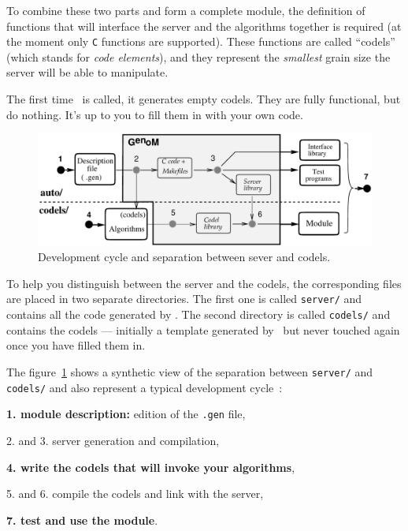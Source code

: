 To combine these two parts and form  a complete module, the definition of
functions that  will interface the server and  the algorithms together is
required (at the moment  only {\tt  C}  functions are  supported).  These
functions are  called ``codels'' (which  stands for {\em code elements}),
and they represent the {\em smallest} grain size  the server will be able
to manipulate.

The first  time \GenoM\  is called,  it generates empty  codels. They are
fully  functional, but do  nothing. It's up to  you to fill  them in with
your own code.

\bigbreak

\begin{figure}[htbp]
\centering
\includegraphics[width=0.8\hsize]{fig/cycle-en}
\caption{Development cycle and separation between sever and codels.}
\label{fig|session|cycle}
\end{figure}

To help   you distinguish  between   the  server   and the   codels,  the
corresponding files are placed in two separate directories. The first one
is called {\tt server/} and contains all  the code generated by \GenoM. The
second directory is called {\tt   codels/} and  contains the codels   ---
initially a template generated by \GenoM\ but never touched again once
you have filled them in.

\bigbreak

The figure~\ref{fig|session|cycle} shows a synthetic view of the
separation between {\tt server/} and {\tt codels/} and also represent a
typical development cycle~:

\begin{description}
   \item{\bf 1. module description:} edition of the {\tt .gen} file,
   \item{2. and 3. server generation and compilation},
   \item{\bf 4. write the codels that will invoke your algorithms},
   \item{5. and 6. compile the codels and link with the server},
   \item{\bf 7. test and use the module}.
\end{description}

